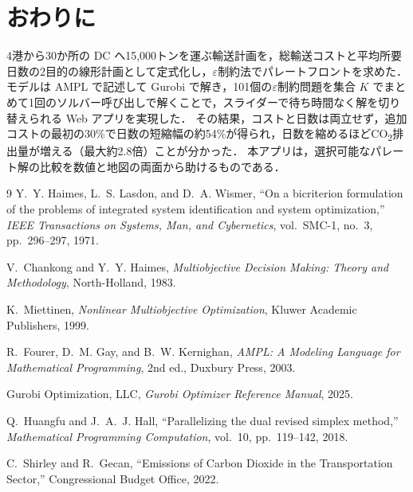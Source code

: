 \documentclass[a4paper,11pt]{ltjsarticle}
\newcommand{\COO}{CO\textsubscript{2}}
\begin{document}
\section{おわりに}
\enlargethispage{3\baselineskip}
4港から30か所の DC へ15,000トンを運ぶ輸送計画を，総輸送コストと平均所要日数の2目的の線形計画として定式化し，$\varepsilon$制約法でパレートフロントを求めた．
モデルは AMPL で記述して Gurobi で解き，101個の$\varepsilon$制約問題を集合 $K$ でまとめて1回のソルバー呼び出しで解くことで，スライダーで待ち時間なく解を切り替えられる Web アプリを実現した．
その結果，コストと日数は両立せず，追加コストの最初の30\%で日数の短縮幅の約54\%が得られ，日数を縮めるほど\COO{}排出量が増える（最大約2.8倍）ことが分かった．
本アプリは，選択可能なパレート解の比較を数値と地図の両面から助けるものである．

\begin{thebibliography}{9}\footnotesize\setlength{\itemsep}{0pt}\setlength{\parsep}{0pt}
Y.~Y. Haimes, L.~S. Lasdon, and D.~A. Wismer,
``On a bicriterion formulation of the problems of integrated system identification and system optimization,''
\textit{IEEE Transactions on Systems, Man, and Cybernetics}, vol.~SMC-1, no.~3, pp.~296--297, 1971.

V.~Chankong and Y.~Y. Haimes,
\textit{Multiobjective Decision Making: Theory and Methodology}, North-Holland, 1983.

K.~Miettinen,
\textit{Nonlinear Multiobjective Optimization}, Kluwer Academic Publishers, 1999.

R.~Fourer, D.~M. Gay, and B.~W. Kernighan,
\textit{AMPL: A Modeling Language for Mathematical Programming}, 2nd ed., Duxbury Press, 2003.

Gurobi Optimization, LLC,
\textit{Gurobi Optimizer Reference Manual}, 2025.

Q.~Huangfu and J.~A.~J. Hall,
``Parallelizing the dual revised simplex method,''
\textit{Mathematical Programming Computation}, vol.~10, pp.~119--142, 2018.

C.~Shirley and R.~Gecan,
``Emissions of Carbon Dioxide in the Transportation Sector,''
Congressional Budget Office, 2022.
\end{thebibliography}
\end{document}

